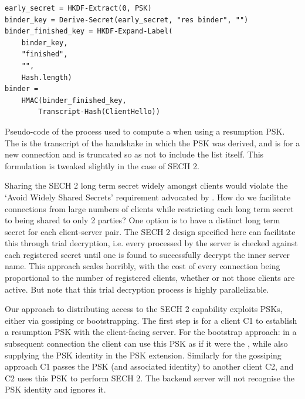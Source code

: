 \begin{listing}
    \begin{verbatim}
early_secret = HKDF-Extract(0, PSK)
binder_key = Derive-Secret(early_secret, "res binder", "")
binder_finished_key = HKDF-Expand-Label(
    binder_key,
    "finished",
    "",
    Hash.length)
binder =
    HMAC(binder_finished_key,
        Transcript-Hash(ClientHello))
    \end{verbatim}
    \captionsetup{width=.8\linewidth} 
    \caption[Pseudo-code for Computation of  ]{\label{lst:binder-pseudocode}Pseudo-code of the process used to compute a  when using a resumption PSK. The  is the transcript of the handshake in which the PSK was derived, and  is for a new connection and is truncated so as not to include the  list itself. This formulation is tweaked slightly in the case of SECH 2.}
\end{listing}




Sharing the SECH 2 long term secret widely amongst clients would violate the `Avoid Widely Shared Secrets' requirement advocated by \citep{rfc8744-issues}. How do we facilitate connections from large numbers of clients while restricting each long term secret to being shared to only 2 parties? One option is to have a distinct long term secret for each client-server pair. The SECH 2 design specified here can facilitate this through trial decryption, i.e. every  processed by the server is checked against each registered secret until one is found to successfully decrypt the inner server name. This approach scales horribly, with the cost of every connection being proportional to the number of registered clients, whether or not those clients are active. But note that this trial decryption process is highly parallelizable.

Our approach to distributing access to the \ac{SECH} 2 capability
exploits \ac{PSK}s, either via gossiping or bootstrapping.
The first step is for a client C1 to establish a resumption \ac{PSK} with
the client-facing server.
For the bootstrap approach: in a subsequent connection the client can use this \ac{PSK}
as if it were the , while also supplying
the \ac{PSK} identity in the \ac{PSK} extension.
Similarly for the gossiping approach C1 passes the \ac{PSK} (and associated identity)
to another client C2, and C2 uses this \ac{PSK} to perform \ac{SECH} 2.
The backend server will not recognise the \ac{PSK} identity and ignores it.

